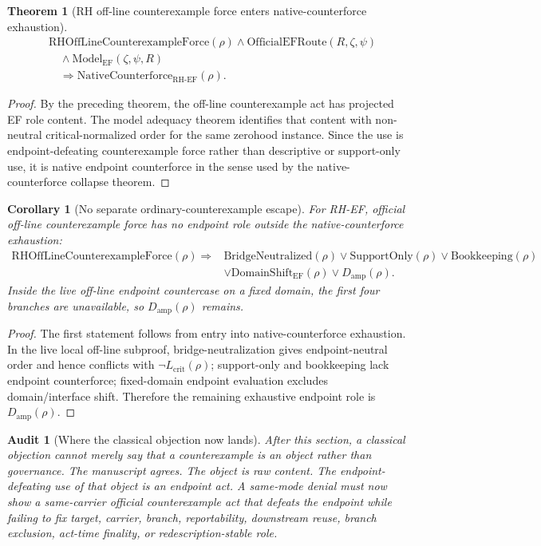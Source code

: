 \documentclass[11pt]{article}
\newtheorem{theorem}{Theorem}[section]
\newtheorem{corollary}{Corollary}[section]
\newtheorem{audit}{Audit}[section]
\newcommand{\Lcrit}{L_{\mathrm{crit}}}
\newcommand{\RH}{\mathrm{RH}}
\newcommand{\EF}{\mathrm{EF}}
\newcommand{\RHOffCxForce}{\mathrm{RHOffLineCounterexampleForce}}
\newcommand{\ModelEF}{\mathrm{Model}_{\mathrm{EF}}}
\newcommand{\OfficialEFRoute}{\mathrm{OfficialEFRoute}}
\newcommand{\Damp}{D_{\mathrm{amp}}}
\newcommand{\Book}{\mathrm{Bookkeeping}}
\newcommand{\Support}{\mathrm{SupportOnly}}
\newcommand{\NativeCounterforce}{\mathrm{NativeCounterforce}}
\newcommand{\BridgeNeutralized}{\mathrm{BridgeNeutralized}}
\newcommand{\DomainShiftEF}{\mathrm{DomainShift}_{\mathrm{EF}}}
\begin{document}
\begin{theorem}[RH off-line counterexample force enters native-counterforce exhaustion]
\[
\begin{aligned}
&\RHOffCxForce(\rho)\wedge\OfficialEFRoute(R,\zeta,\psi)\\
&\quad\wedge\ModelEF(\zeta,\psi,R)\\
&\quad\Rightarrow \NativeCounterforce_{\RH\text{-}\EF}(\rho).
\end{aligned}
\]
\end{theorem}

\begin{proof}
By the preceding theorem, the off-line counterexample act has projected EF role content. The model adequacy theorem identifies that content with non-neutral critical-normalized order for the same zerohood instance. Since the use is endpoint-defeating counterexample force rather than descriptive or support-only use, it is native endpoint counterforce in the sense used by the native-counterforce collapse theorem.
\end{proof}

\begin{corollary}[No separate ordinary-counterexample escape]
For RH-EF, official off-line counterexample force has no endpoint role outside the native-counterforce exhaustion:
\[
\begin{aligned}
\RHOffCxForce(\rho)\Rightarrow{}&\BridgeNeutralized(\rho)\vee\Support(\rho)\vee\Book(\rho)\\
&\vee\DomainShiftEF(\rho)\vee\Damp(\rho).
\end{aligned}
\]
Inside the live off-line endpoint countercase on a fixed domain, the first four branches are unavailable, so \(\Damp(\rho)\) remains.
\end{corollary}

\begin{proof}
The first statement follows from entry into native-counterforce exhaustion. In the live local off-line subproof, bridge-neutralization gives endpoint-neutral order and hence conflicts with \(\neg\Lcrit(\rho)\); support-only and bookkeeping lack endpoint counterforce; fixed-domain endpoint evaluation excludes domain/interface shift. Therefore the remaining exhaustive endpoint role is \(\Damp(\rho)\).
\end{proof}

\begin{audit}[Where the classical objection now lands]
After this section, a classical objection cannot merely say that a counterexample is an object rather than governance. The manuscript agrees. The object is raw content. The endpoint-defeating use of that object is an endpoint act. A same-mode denial must now show a same-carrier official counterexample act that defeats the endpoint while failing to fix target, carrier, branch, reportability, downstream reuse, branch exclusion, act-time finality, or redescription-stable role.
\end{audit}
\end{document}

